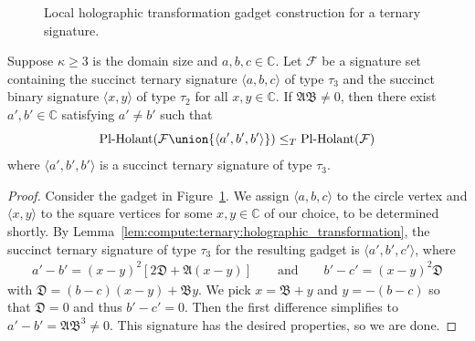 \documentclass[11pt]{article}
\newcommand{\PlHolant}{\operatorname{Pl-Holant}}
\def\borderColor{blue!60}
\def\scale{0.6}
\def\nodeDist{1.4cm}
\begin{document}
\begin{figure}[t]
 \centering
 \caption{Local holographic transformation gadget construction for a ternary signature.}
 \label{fig:gadget:ternary:local_holographic_transformation}
\end{figure}

\begin{lemma} \label{lem:ternary:construct_abb}
 Suppose $\kappa \ge 3$ is the domain size and $a,b,c \in \mathbb{C}$.
 Let $\mathcal{F}$ be a signature set containing the succinct ternary signature $\langle a,b,c \rangle$ of type $\tau_3$
 and the succinct binary signature $\langle x,y \rangle$ of type $\tau_2$ for all $x,y \in \mathbb{C}$.
 If $\mathfrak{A} \mathfrak{B} \ne 0$,
 then there exist $a', b' \in \mathbb{C}$ satisfying $a' \ne b'$ such that
 \[
  \PlHolant(\mathcal{F} \union \{\langle a',b',b' \rangle\}) \le_T \PlHolant(\mathcal{F})
 \]
 where $\langle a',b',b' \rangle$ is a succinct ternary signature of type $\tau_3$.
\end{lemma}

\begin{proof}
 Consider the gadget in Figure~\ref{fig:gadget:ternary:local_holographic_transformation}.
 We assign $\langle a,b,c \rangle$ to the circle vertex and $\langle x,y \rangle$ to the square vertices for some $x,y \in \mathbb{C}$ of our choice,
 to be determined shortly.
 By Lemma~\ref{lem:compute:ternary:holographic_transformation},
 the succinct ternary signature of type $\tau_3$ for the resulting gadget is $\langle a',b',c' \rangle$,
 where
 \begin{align*}
  a' - b' = (x - y)^2 [2 \mathfrak{D} + \mathfrak{A} (x - y)]
            \qquad \text{and} \qquad
  b' - c' = (x - y)^2 \mathfrak{D}
 \end{align*}
 with $\mathfrak{D} = (b - c) (x - y) + \mathfrak{B} y$.
 We pick $x = \mathfrak{B} + y$ and $y = -(b - c)$ so that $\mathfrak{D} = 0$ and thus $b' - c' = 0$.
 Then the first difference simplifies to $a' - b' = \mathfrak{A} \mathfrak{B}^3 \ne 0$.
 This signature has the desired properties,
 so we are done.
\end{proof}
\end{document}
